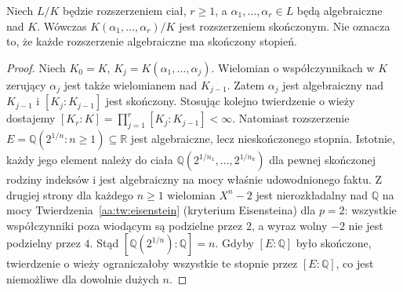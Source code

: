 \begin{wniosek}
\label{aa:wn:finite-algebraic-generators}
Niech $L/K$ będzie rozszerzeniem ciał, $r\ge1$,
a $\alpha_1,\ldots,\alpha_r\in L$ będą algebraiczne nad $K$.
Wówczas
$K(\alpha_1,\ldots,\alpha_r)/K$ jest rozszerzeniem
skończonym. Nie oznacza to, że każde rozszerzenie
algebraiczne ma skończony stopień.
\end{wniosek}
\begin{proof}
Niech $K_0=K$, $K_j=K(\alpha_1,\ldots,\alpha_j)$.
Wielomian o współczynnikach w $K$ zerujący
$\alpha_j$ jest także wielomianem nad $K_{j-1}$.
Zatem $\alpha_j$ jest algebraiczny nad $K_{j-1}$
i $[K_j:K_{j-1}]$ jest skończony.
Stosując kolejno twierdzenie o wieży dostajemy
$[K_r:K]=\prod_{j=1}^r[K_j:K_{j-1}]<\infty$.
Natomiast rozszerzenie
$E=\mathbb Q(2^{1/n}:n\ge1)\subseteq\mathbb R$
jest algebraiczne, lecz nieskończonego stopnia.
Istotnie, każdy jego element należy do ciała
$\mathbb Q(2^{1/n_1},\ldots,2^{1/n_k})$ dla
pewnej skończonej rodziny indeksów i jest algebraiczny
na mocy właśnie udowodnionego faktu. Z drugiej strony
dla każdego $n\ge1$ wielomian $X^n-2$ jest
nierozkładalny nad $\mathbb Q$ na mocy
Twierdzenia~\ref{aa:tw:eisenstein} (kryterium Eisensteina)
dla $p=2$: wszystkie współczynniki poza wiodącym
są podzielne przez $2$, a wyraz wolny $-2$
nie jest podzielny przez $4$. Stąd
$[\mathbb Q(2^{1/n}):\mathbb Q]=n$.
Gdyby $[E:\mathbb Q]$ było skończone, twierdzenie
o wieży ograniczałoby wszystkie te stopnie przez
$[E:\mathbb Q]$, co jest niemożliwe dla dowolnie
dużych $n$.
\end{proof}


